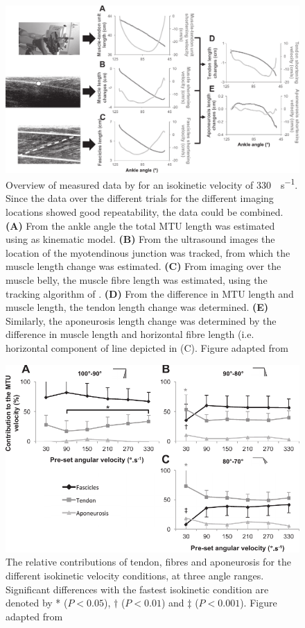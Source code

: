 	\begin{figure}[!t]
		\centering
		\includegraphics[width=\linewidth]{Figures/mtu_imaging/hauraix_2013_mtu_velocity.pdf}
		\caption{Overview of measured data by \citeauthor{hauraix_shortening_2013} for an isokinetic velocity of \SI{330}{\deg\per\second}. Since the data over the different trials for the different imaging locations showed good repeatability, the data could be combined. \textbf{(A)} From the ankle angle the total MTU length was estimated using as kinematic model. \textbf{(B)} From the ultrasound images the location of the myotendinous junction was tracked, from which the muscle length change was estimated. \textbf{(C)} From imaging over the muscle belly, the muscle fibre length was estimated, using the tracking algorithm of \citet{cronin_automatic_2011}. \textbf{(D)} From the difference in MTU length and muscle length, the tendon length change was determined. \textbf{(E)} Similarly, the aponeurosis length change was determined by the difference in muscle length and horizontal fibre length (i.e. horizontal component of line depicted in (C). Figure adapted from \citet{hauraix_shortening_2013}}
		\label{fig:hauraix_2013}
	\end{figure}
	
	\begin{figure}[t]
		\centering
		\includegraphics[width=.8\linewidth]{Figures/mtu_imaging/hauraix_2013_mtu_contrib.pdf}
		\caption{The relative contributions of tendon, fibres and aponeurosis for the different isokinetic velocity conditions, at three angle ranges. Significant differences with the fastest isokinetic condition are denoted by * ($P<0.05$), $\dag$ ($P<0.01$) and $\ddag$ ($P<0.001$). Figure adapted from \citet{hauraix_shortening_2013}}
		\label{fig:hauraix_2013_contrib}
	\end{figure}

